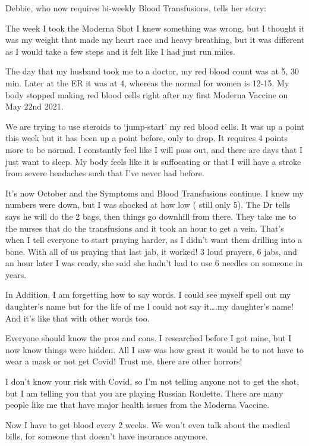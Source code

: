 Debbie, who now requires bi-weekly Blood Transfusions, tells her story:

The week I took the Moderna Shot I knew something was wrong, but I thought it
was my weight that made my heart race and heavy breathing, but it was different
as I would take a few steps and it felt like I had just run miles.

The day that my husband took me to a doctor, my red blood count was at 5, 30
min. Later at the ER it was at 4, whereas the normal for women is 12-15. My body
stopped making red blood cells right after my first Moderna Vaccine on May 22nd
2021.

We are trying to use steroids to ‘jump-start’ my red blood cells. It was up a
point this week but it has been up a point before, only to drop. It requires 4
points more to be normal. I constantly feel like I will pass out, and there are
days that I just want to sleep. My body feels like it is suffocating or that I
will have a stroke from severe headaches such that I’ve never had before.

It’s now October and the Symptoms and Blood Transfusions continue. I knew my
numbers were down, but I was shocked at how low ( still only 5). The Dr tells
says he will do the 2 bags, then things go downhill from there. They take me to
the nurses that do the transfusions and it took an hour to get a vein. That’s
when I tell everyone to start praying harder, as I didn’t want them drilling
into a bone. With all of us praying that last jab, it worked! 3 loud prayers, 6
jabs, and an hour later I was ready, she said she hadn’t had to use 6 needles on
someone in years.

In Addition, I am forgetting how to say words. I could see myself spell out my
daughter’s name but for the life of me I could not say it….my daughter’s name!
And it’s like that with other words too.

Everyone should know the pros and cons. I researched before I got mine, but I
now know things were hidden. All I saw was how great it would be to not have to
wear a mask or not get Covid! Trust me, there are other horrors!

I don’t know your risk with Covid, so I’m not telling anyone not to get the
shot, but I am telling you that you are playing Russian Roulette. There are many
people like me that have major health issues from the Moderna Vaccine.

Now I have to get blood every 2 weeks. We won’t even talk about the medical
bills, for someone that doesn’t have insurance anymore.
